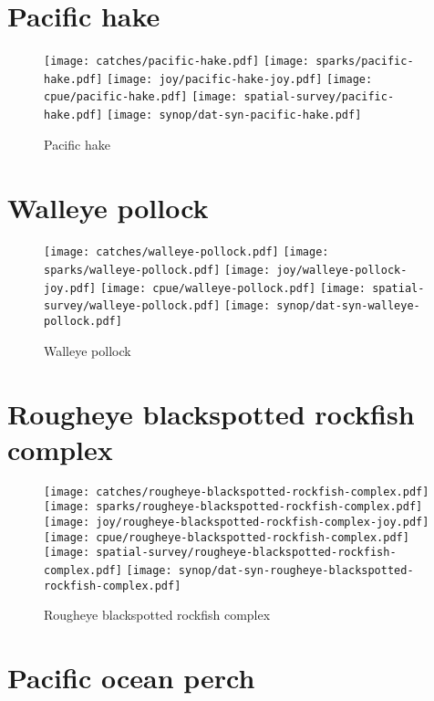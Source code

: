 \section*{Pacific hake}

\begin{figure}[htbp]
\centering
\texttt{[image: catches/pacific-hake.pdf]}
\texttt{[image: sparks/pacific-hake.pdf]}
\texttt{[image: joy/pacific-hake-joy.pdf]}
\texttt{[image: cpue/pacific-hake.pdf]}
\texttt{[image: spatial-survey/pacific-hake.pdf]}
\texttt{[image: synop/dat-syn-pacific-hake.pdf]}
\caption{Pacific hake}
\end{figure}
\clearpage
\section*{Walleye pollock}

\begin{figure}[htbp]
\centering
\texttt{[image: catches/walleye-pollock.pdf]}
\texttt{[image: sparks/walleye-pollock.pdf]}
\texttt{[image: joy/walleye-pollock-joy.pdf]}
\texttt{[image: cpue/walleye-pollock.pdf]}
\texttt{[image: spatial-survey/walleye-pollock.pdf]}
\texttt{[image: synop/dat-syn-walleye-pollock.pdf]}
\caption{Walleye pollock}
\end{figure}
\clearpage
\section*{Rougheye blackspotted rockfish complex}

\begin{figure}[htbp]
\centering
\texttt{[image: catches/rougheye-blackspotted-rockfish-complex.pdf]}
\texttt{[image: sparks/rougheye-blackspotted-rockfish-complex.pdf]}
\texttt{[image: joy/rougheye-blackspotted-rockfish-complex-joy.pdf]}
\texttt{[image: cpue/rougheye-blackspotted-rockfish-complex.pdf]}
\texttt{[image: spatial-survey/rougheye-blackspotted-rockfish-complex.pdf]}
\texttt{[image: synop/dat-syn-rougheye-blackspotted-rockfish-complex.pdf]}
\caption{Rougheye blackspotted rockfish complex}
\end{figure}
\clearpage
\section*{Pacific ocean perch}

